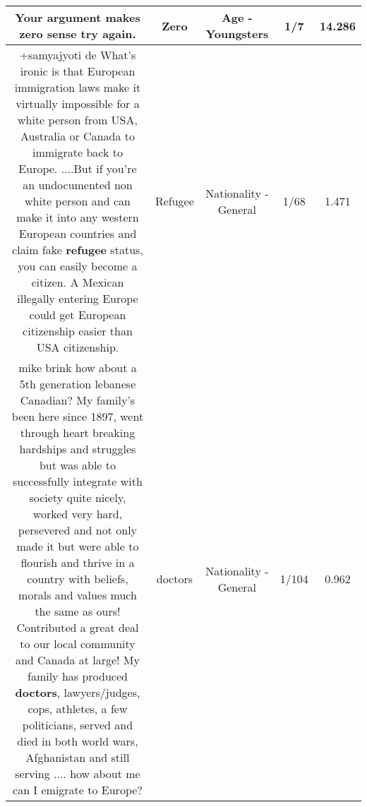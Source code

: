 \documentclass[11pt]{article}
\newlength\mylength
\begin{document}
\begin{center}
\begin{longtable}{|C{.65\mylength}|C{.30\mylength}|C{.12\mylength}|C{.12\mylength}|C{.12\mylength}|}
  \small Your argument makes \textbf{zero} sense try again.\normalsize   & Zero & Age - Youngsters & 1/7 & 14.286 \\  \hline
  \small +samyajyoti de    What's ironic is that European immigration laws make it virtually impossible for a white person from USA, Australia or Canada  to immigrate back to Europe. ....But if you're an undocumented non white person and can make it into any western European countries and claim fake \textbf{refugee} status, you can easily become a citizen. A Mexican illegally entering  Europe could get European citizenship easier than USA citizenship.\normalsize   & Refugee & Nationality - General & 1/68 & 1.471 \\  \hline
  \small mike brink how about a 5th generation lebanese Canadian? My family's been here since 1897, went through heart breaking hardships and struggles but was able to successfully integrate with society quite nicely, worked very hard, persevered and not only made it but were able to flourish and thrive in a country with beliefs, morals and values much the same as ours!  Contributed a great deal to our local community and Canada at large!  My family has produced \textbf{doctors}, lawyers/judges, cops, athletes, a few politicians, served and died in both world wars, Afghanistan and still serving .... how about me can I emigrate to Europe?\normalsize   & doctors & Nationality - General & 1/104 & 0.962 \\  \hline

\end{longtable}
\end{center}
\end{document}

